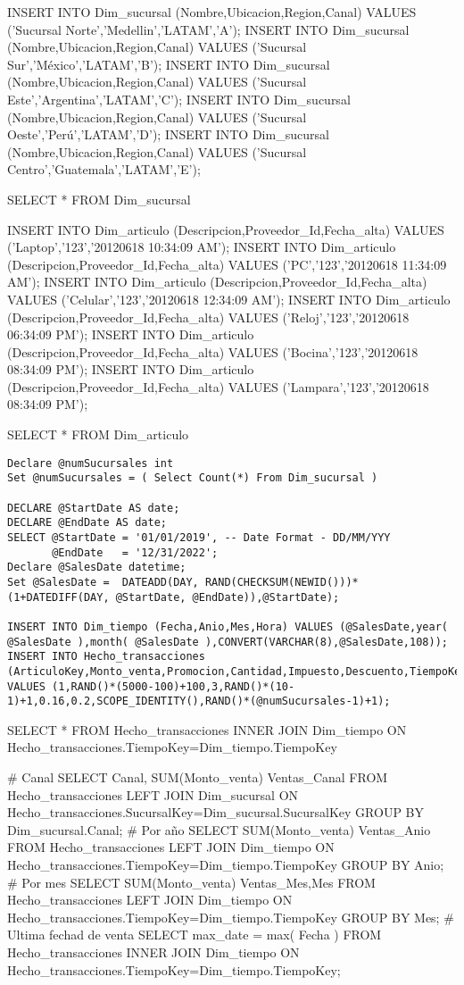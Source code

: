 INSERT INTO Dim_sucursal (Nombre,Ubicacion,Region,Canal) VALUES ('Sucursal Norte','Medellin','LATAM','A');
INSERT INTO Dim_sucursal (Nombre,Ubicacion,Region,Canal) VALUES ('Sucursal Sur','México','LATAM','B');
INSERT INTO Dim_sucursal (Nombre,Ubicacion,Region,Canal) VALUES ('Sucursal Este','Argentina','LATAM','C');
INSERT INTO Dim_sucursal (Nombre,Ubicacion,Region,Canal) VALUES ('Sucursal Oeste','Perú','LATAM','D');
INSERT INTO Dim_sucursal (Nombre,Ubicacion,Region,Canal) VALUES ('Sucursal Centro','Guatemala','LATAM','E');

SELECT * FROM  Dim_sucursal

INSERT INTO Dim_articulo (Descripcion,Proveedor_Id,Fecha_alta) VALUES ('Laptop','123','20120618 10:34:09 AM');
INSERT INTO Dim_articulo (Descripcion,Proveedor_Id,Fecha_alta) VALUES ('PC','123','20120618 11:34:09 AM');
INSERT INTO Dim_articulo (Descripcion,Proveedor_Id,Fecha_alta) VALUES ('Celular','123','20120618 12:34:09 AM');
INSERT INTO Dim_articulo (Descripcion,Proveedor_Id,Fecha_alta) VALUES ('Reloj','123','20120618 06:34:09 PM');
INSERT INTO Dim_articulo (Descripcion,Proveedor_Id,Fecha_alta) VALUES ('Bocina','123','20120618 08:34:09 PM');
INSERT INTO Dim_articulo (Descripcion,Proveedor_Id,Fecha_alta) VALUES ('Lampara','123','20120618 08:34:09 PM');

SELECT * FROM  Dim_articulo

\begin{lstlisting}[numbers=none]
Declare @numSucursales int
Set @numSucursales = ( Select Count(*) From Dim_sucursal )

DECLARE @StartDate AS date;
DECLARE @EndDate AS date;
SELECT @StartDate = '01/01/2019', -- Date Format - DD/MM/YYY
       @EndDate   = '12/31/2022';
Declare @SalesDate datetime;
Set @SalesDate =  DATEADD(DAY, RAND(CHECKSUM(NEWID()))*(1+DATEDIFF(DAY, @StartDate, @EndDate)),@StartDate);

INSERT INTO Dim_tiempo (Fecha,Anio,Mes,Hora) VALUES (@SalesDate,year( @SalesDate ),month( @SalesDate ),CONVERT(VARCHAR(8),@SalesDate,108));
INSERT INTO Hecho_transacciones (ArticuloKey,Monto_venta,Promocion,Cantidad,Impuesto,Descuento,TiempoKey,SucursalKey) VALUES (1,RAND()*(5000-100)+100,3,RAND()*(10-1)+1,0.16,0.2,SCOPE_IDENTITY(),RAND()*(@numSucursales-1)+1);
\end{lstlisting}

SELECT * FROM  Hecho_transacciones INNER JOIN Dim_tiempo ON Hecho_transacciones.TiempoKey=Dim_tiempo.TiempoKey

# Canal
SELECT Canal, SUM(Monto_venta) Ventas_Canal FROM Hecho_transacciones LEFT JOIN Dim_sucursal ON Hecho_transacciones.SucursalKey=Dim_sucursal.SucursalKey GROUP BY Dim_sucursal.Canal;
# Por año
SELECT SUM(Monto_venta) Ventas_Anio FROM Hecho_transacciones LEFT JOIN Dim_tiempo ON Hecho_transacciones.TiempoKey=Dim_tiempo.TiempoKey GROUP BY Anio;
# Por mes
SELECT SUM(Monto_venta) Ventas_Mes,Mes FROM Hecho_transacciones LEFT JOIN Dim_tiempo ON Hecho_transacciones.TiempoKey=Dim_tiempo.TiempoKey GROUP BY Mes;
# Ultima fechad de venta
SELECT max_date = max( Fecha ) FROM Hecho_transacciones INNER JOIN Dim_tiempo ON Hecho_transacciones.TiempoKey=Dim_tiempo.TiempoKey;


